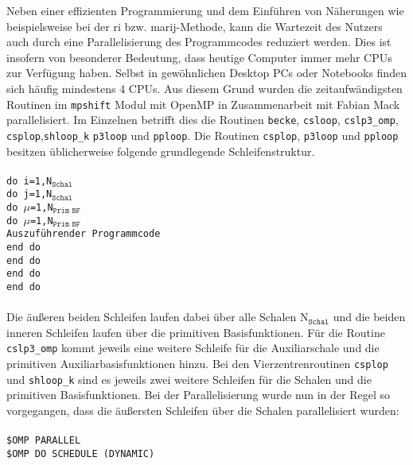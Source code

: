 \bigskip
Neben einer effizienten Programmierung und dem Einführen von Näherungen wie beispielsweise bei der \ac{ri} bzw. \ac{marij}-Methode, kann die Wartezeit des Nutzers auch durch eine Parallelisierung des Programmcodes reduziert werden. Dies ist insofern von besonderer Bedeutung, dass heutige Computer immer mehr CPUs zur Verfügung haben. Selbst in gewöhnlichen Desktop PCs oder Notebooks finden sich häufig mindestens 4 CPUs. Aus diesem Grund wurden die zeitaufwändigsten Routinen im \texttt{mpshift} Modul mit OpenMP\supercite{dagum1998openmp} in Zusammenarbeit mit Fabian Mack parallelisiert. Im Einzelnen betrifft dies die Routinen \texttt{becke}, \texttt{csloop}, \texttt{cslp3\_omp}, \texttt{csplop},\texttt{shloop\_k} \texttt{p3loop} und \texttt{pploop}. Die Routinen \texttt{csplop}, \texttt{p3loop} und \texttt{pploop} besitzen üblicherweise folgende grundlegende Schleifenstruktur.\\
\\
\texttt{do i=1,N$_{\texttt{Schal}}$}\\ 
\null\quad\texttt{do j=1,N$_{\texttt{Schal}}$}\\ 
\null\quad\quad\texttt{do $\mu$=1,N$_{\texttt{Prim BF}}$}\\ 
\null\quad\quad\quad\texttt{do $\mu$=1,N$_{\texttt{Prim BF}}$}\\
\null\quad\quad\quad\quad \texttt{Auszuführender Programmcode}\\ 
\null\quad\quad\quad\texttt{end do}\\ 
\null\quad\quad\texttt{end do}\\ 
\null\quad\texttt{end do}\\ 
\texttt{end do}\\
\\
Die äußeren beiden Schleifen laufen dabei über alle Schalen N$_{\texttt{Schal}}$ und die beiden inneren Schleifen laufen über die primitiven Basisfunktionen. Für die Routine \texttt{cslp3\_omp} kommt jeweils eine weitere Schleife für die Auxiliarschale und die primitiven Auxiliarbasisfunktionen hinzu. Bei den Vierzentrenroutinen \texttt{csplop} und \texttt{shloop\_k} sind es jeweils zwei weitere Schleifen für die Schalen und die primitiven Basisfunktionen. Bei der Parallelisierung wurde nun in der Regel so vorgegangen, dass die äußersten Schleifen über die Schalen parallelisiert wurden:\\
\\
\texttt{\$OMP PARALLEL}\\
\texttt{\$OMP DO SCHEDULE (DYNAMIC)}\\
